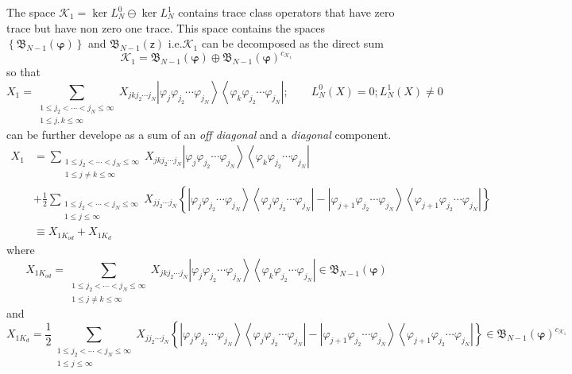 \documentclass[aps,preprint]{revtex4}%
\begin{document}
The space $\mathcal{K}_{1}=\ker L_{N}^{0}\ominus\ker L_{N}^{1}$ contains trace
class operators that have zero trace but have non zero one trace. This space
contains the spaces $\left\{  \mathfrak{B}_{N-1}\left(  \mathbf{\varphi
}\right)  \right\}  $ and $\mathfrak{B}_{N-1}\left(  \mathsf{z}\right)  $
i.e.$\mathcal{K}_{1}$ can be decomposed as the direct sum
\begin{equation}
\mathcal{K}_{1}=\mathfrak{B}_{N-1}\left(  \mathbf{\varphi}\right)
\oplus\mathfrak{B}_{N-1}\left(  \mathbf{\varphi}\right)  ^{c_{\mathcal{K}_{1}%
}}%
\end{equation}
so that
\begin{equation}
X_{1}=\sum_{\substack{1\leq j_{2}<\cdots<j_{N}\leq\infty\\1\leq j,k\leq\infty
}}X_{jkj_{2}\cdots j_{N}}\left\vert \varphi_{j}\varphi_{j_{2}}\cdots
\varphi_{j_{N}}\right\rangle \left\langle \varphi_{k}\varphi_{j_{2}}%
\cdots\varphi_{j_{N}}\right\vert ;\qquad L_{N}^{0}\left(  X\right)
=0;L_{N}^{1}\left(  X\right)  \neq0
\end{equation}
can be further develope as a sum of an \textit{off diagonal }and a
\textit{diagonal }component.\textit{ }
\begin{align}
X_{1} &  =\sum_{\substack{1\leq j_{2}<\cdots<j_{N}\leq\infty\\1\leq j\neq
k\leq\infty}}X_{jkj_{2}\cdots j_{N}}\left\vert \varphi_{j}\varphi_{j_{2}%
}\cdots\varphi_{j_{N}}\right\rangle \left\langle \varphi_{k}\varphi_{j_{2}%
}\cdots\varphi_{j_{N}}\right\vert \\
&  +\frac{1}{2}\sum_{\substack{1\leq j_{2}<\cdots<j_{N}\leq\infty\\1\leq
j\leq\infty}}X_{jj_{2}\cdots j_{N}}\left\{  \left\vert \varphi_{j}%
\varphi_{j_{2}}\cdots\varphi_{j_{N}}\right\rangle \left\langle \varphi
_{j}\varphi_{j_{2}}\cdots\varphi_{j_{N}}\right\vert -\left\vert \varphi
_{j+1}\varphi_{j_{2}}\cdots\varphi_{j_{N}}\right\rangle \left\langle
\varphi_{j+1}\varphi_{j_{2}}\cdots\varphi_{j_{N}}\right\vert \right\}  \\
&  \equiv X_{1K_{od}}+X_{1K_{d}}%
\end{align}
where
\begin{equation}
X_{1K_{od}}=\sum_{\substack{1\leq j_{2}<\cdots<j_{N}\leq\infty\\1\leq j\neq
k\leq\infty}}X_{jkj_{2}\cdots j_{N}}\left\vert \varphi_{j}\varphi_{j_{2}%
}\cdots\varphi_{j_{N}}\right\rangle \left\langle \varphi_{k}\varphi_{j_{2}%
}\cdots\varphi_{j_{N}}\right\vert \in\mathfrak{B}_{N-1}\left(  \mathbf{\varphi
}\right)
\end{equation}
and
\begin{equation}
X_{1K_{d}}=\frac{1}{2}\sum_{\substack{1\leq j_{2}<\cdots<j_{N}\leq
\infty\\1\leq j\leq\infty}}X_{jj_{2}\cdots j_{N}}\left\{  \left\vert
\varphi_{j}\varphi_{j_{2}}\cdots\varphi_{j_{N}}\right\rangle \left\langle
\varphi_{j}\varphi_{j_{2}}\cdots\varphi_{j_{N}}\right\vert -\left\vert
\varphi_{j+1}\varphi_{j_{2}}\cdots\varphi_{j_{N}}\right\rangle \left\langle
\varphi_{j+1}\varphi_{j_{2}}\cdots\varphi_{j_{N}}\right\vert \right\}
\in\mathfrak{B}_{N-1}\left(  \mathbf{\varphi}\right)  ^{c_{\mathcal{K}_{1}}}%
\end{equation}
\end{document}
